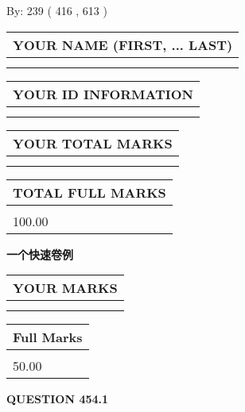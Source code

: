 \documentclass{ctexart}
\begin{document}
   
\hspace{1.0in} By: 
 239 ( 416 ,  613 )
   
   
   
   
\newpage 
\setcounter{page}{ 
   454001 } 
   
   
   
   
\noindent\begin{tabular}{|l|}
\hline
YOUR NAME (FIRST, ... LAST)  \\
\hline
 \\ 
 \\ 
\hline
\end{tabular}
\hspace{0.05in} \begin{tabular}{|l|}
\hline
 YOUR   ID   INFORMATION  \\
\hline
 \\ 
 \\ 
\hline
\end{tabular}
   
   
\vspace{0.2in}\noindent\begin{tabular}{|l|}
\hline
YOUR TOTAL MARKS  \\
\hline
 \\ 
 \\ 
\hline
\end{tabular}
\hspace{0.05in} \begin{tabular}{|l|}
\hline
TOTAL FULL MARKS  \\
\hline
 \\ 
100.00 \\
\hline
\end{tabular}
   
   
 \vspace{0.2in}
{\LARGE {\textbf{ 一个快速卷例}}}
   
   
  
\vspace{0.2in}
  
\noindent\begin{tabular}{|l|}
\hline
 YOUR MARKS  \\
\hline
 \\ 
 \\ 
\hline
\end{tabular}
\hspace{0.05in} \begin{tabular}{|l|}
\hline
 Full Marks  \\
\hline
 \\ 
50.00 \\
\hline
\end{tabular}
{\textbf{\Large{QUESTION
454.1 
}}}
  
\end{document}
